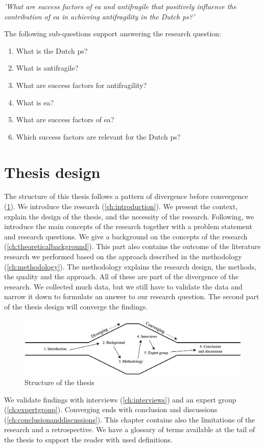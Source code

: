 \vspace{\baselineskip}
\noindent \emph{'What are success factors of \gls{ea} and \gls{antifragile} that positively influence the contribution of \gls{ea} in achieving \gls{antifragility} in the Dutch \gls{ps}?'}
\vspace{\baselineskip}

\noindent The following sub-questions support answering the research question:
\begin{enumerate}
	\item{What is the Dutch \gls{ps}?}
	\item{What is \gls{antifragile}?}
	\item{What are success factors for \gls{antifragility}?}
	\item{What is \gls{ea}?}
	\item{What are success factors of \gls{ea}?}
	\item{Which success factors are relevant for the Dutch \gls{ps}?}
\end{enumerate}

\section{Thesis design}
\label{sec:structure}
The structure of this thesis follows a pattern of divergence before convergence (\cref{fig:design}). We introduce the research (\cref{ch:introduction}). We present the context, explain the design of the thesis, and the necessity of the research. Following, we introduce the main concepts of the research together with a problem statement and research questions. We give a background on the concepts of the research (\cref{ch:theoreticalbackground}). This part also contains the outcome of the literature research we performed based on the approach described in the methodology (\cref{ch:methodology}). The methodology explains the research design, the methods, the quality and the approach. All of these are part of the divergence of the research. We collected much data, but we still have to validate the data and narrow it down to formulate an answer to our research question. The second part of the thesis design will converge the findings.
\begin{figure}[H]
	\centering
	\includegraphics[width=0.9\linewidth]{images/structure}
	\caption[Design of the thesis]{Structure of the thesis}
	\label{fig:design}
\end{figure}
We validate findings with interviews (\cref{ch:interviews}) and an expert group (\cref{ch:expertgroup}). Converging ends with  conclusion and discussions (\cref{ch:conclusionanddiscussions}). This chapter contains also the limitations of the research and a retrospective. We have a glossary of terms available at the tail of the thesis to support the reader with used definitions.
